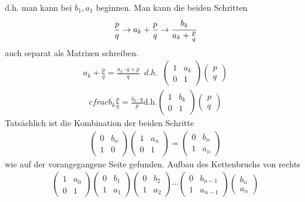 d.h. man kann bei $b_1, a_1$ beginnen.
Man kann die beiden Schritten
\begin{align*}
\frac{p}{q} \rightarrow a_k + \frac{p}{q} \rightarrow \cfrac{b_k}{a_k + \frac{p}{q}}
\end{align*}
auch separat als Matrizen schreiben.
\begin{align*}
a_k + \frac{p}{q} = \frac{a_k \cdot q + p}{q} \enspace d.h. \enspace	
	\begin{pmatrix}
		1& a_k\\
		0& 1
	\end{pmatrix}
	\begin{pmatrix}
		p\\
		q
	\end{pmatrix}
\end{align*}
\begin{align*}
cfrac{b_k}{\frac{p}{q}} = \frac{b_k \cdot q}{p} \textrm{d.h.}	
	\begin{pmatrix}
		1& b_k\\
		0& 1
	\end{pmatrix}
	\begin{pmatrix}
		p\\
		q
	\end{pmatrix}
\end{align*}
Tatsächlich ist die Kombination der beiden Schritte
\begin{align*}
		\begin{pmatrix}
			0& b_n\\
			1& 0
		\end{pmatrix}
		\begin{pmatrix}
			1& a_n\\
			0& 1
		\end{pmatrix}
	=	\begin{pmatrix}
			0& b_n\\
			1& a_n
		\end{pmatrix}
\end{align*}
wie auf der vorangegangene Seite gefunden.
Aufbau des Kettenbruchs von rechts
\begin{align*}
		\begin{pmatrix}
			1& a_0\\
			0& 1
		\end{pmatrix}
		\begin{pmatrix}
			0& b_1\\
			1& a_1
		\end{pmatrix}
		\begin{pmatrix}
			0& b_2\\
			1& a_2
		\end{pmatrix}
		\cdots
		\begin{pmatrix}
			0& b_{n-1}\\
			1& a_{n-1}
		\end{pmatrix}
		\begin{pmatrix}
			b_n\\
			a_n
		\end{pmatrix}
\end{align*}
